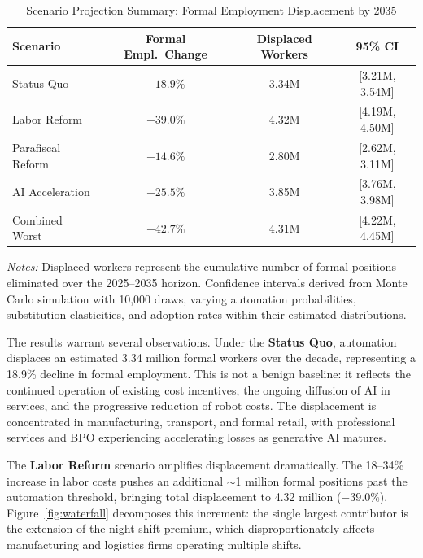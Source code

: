 \documentclass{article}
\begin{document}
\begin{table}[H]
\centering
\caption{Scenario Projection Summary: Formal Employment Displacement by 2035}
\label{tab:scenarios}
\begin{threeparttable}
\begin{tabular}{lccc}
\toprule
\textbf{Scenario} & \textbf{Formal Empl.\ Change} & \textbf{Displaced Workers} & \textbf{95\% CI} \\
\midrule
Status Quo & $-18.9\%$ & 3.34M & [3.21M, 3.54M] \\
Labor Reform & $-39.0\%$ & 4.32M & [4.19M, 4.50M] \\
Parafiscal Reform & $-14.6\%$ & 2.80M & [2.62M, 3.11M] \\
AI Acceleration & $-25.5\%$ & 3.85M & [3.76M, 3.98M] \\
Combined Worst & $-42.7\%$ & 4.31M & [4.22M, 4.45M] \\
\bottomrule
\end{tabular}
\begin{tablenotes}
\small
\item \textit{Notes:} Displaced workers represent the cumulative number of formal positions eliminated over the 2025--2035 horizon. Confidence intervals derived from Monte Carlo simulation with 10,000 draws, varying automation probabilities, substitution elasticities, and adoption rates within their estimated distributions.
\end{tablenotes}
\end{threeparttable}
\end{table}

The results warrant several observations. Under the \textbf{Status Quo}, automation displaces an estimated 3.34 million formal workers over the decade, representing a 18.9\% decline in formal employment. This is not a benign baseline: it reflects the continued operation of existing cost incentives, the ongoing diffusion of AI in services, and the progressive reduction of robot costs. The displacement is concentrated in manufacturing, transport, and formal retail, with professional services and BPO experiencing accelerating losses as generative AI matures.

The \textbf{Labor Reform} scenario amplifies displacement dramatically. The 18--34\% increase in labor costs pushes an additional $\sim$1 million formal positions past the automation threshold, bringing total displacement to 4.32 million ($-39.0\%$). Figure~\ref{fig:waterfall} decomposes this increment: the single largest contributor is the extension of the night-shift premium, which disproportionately affects manufacturing and logistics firms operating multiple shifts.
\end{document}
